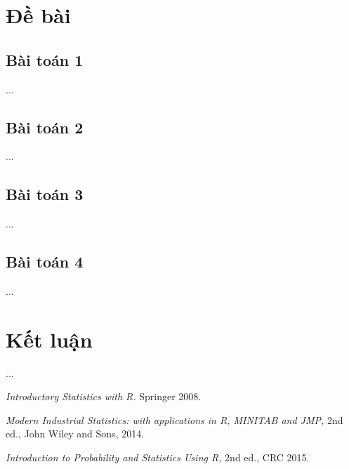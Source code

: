 \documentclass[a4paper]{article}
\begin{document}
\section{Đề bài}\label{bai_tap}
	\subsection{Bài toán 1}  
	...
	\subsection{Bài toán 2}	
	...
	\subsection{Bài toán 3}
	 ...
	\subsection{Bài toán 4}
	 ...

\section{Kết luận}
	...


\begin{thebibliography}{99999}
 {\em Introductory Statistics with R.}  Springer 2008.

{\em Modern Industrial Statistics: with applications in R, MINITAB and JMP,} 2nd ed.,  John Wiley and Sons, 2014.

{\em Introduction to Probability and Statistics Using R,} 2nd ed., CRC 2015.

\end{thebibliography}
\end{document}

